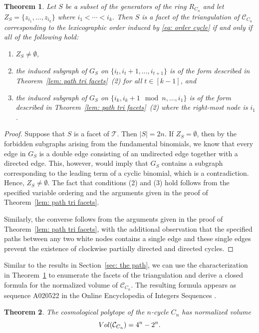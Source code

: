 \documentclass[11pt]{article}
\newtheorem{theo}{Theorem}[section]
\theoremstyle{definition}
\numberwithin{equation}{section}
\begin{document}
\begin{theo}
\label{thm: cycle facets}
Let $S$ be a subset of the generators of the ring $R_{C_{n}}$ and let $Z_S = \{z_{i_1},\ldots, z_{i_k}\}$ where $i_1<\cdots < i_k$.  
Then $S$ is a facet of the triangulation of $\mathcal{C}_{C_{n}}$ corresponding to the lexicographic order induced by \eqref{eq: order cycle} if and only if all of the following hold:
\begin{enumerate}
    \item $Z_S\neq \emptyset$,
    \item the induced subgraph of $G_S$ on $\{i_t, i_t+1,\ldots, i_{t+1}\}$ is of the form described in Theorem~\ref{lem: path tri facets}~(2) for all $t\in[k-1]$, and
    \item the induced subgraph of $G_S$ on $\{i_k, i_k+1 \mod n,\ldots, i_{1}\}$ is of the form described in Theorem~\ref{lem: path tri facets}~(2) where the right-most node is $i_1$.
\end{enumerate}
\end{theo}

\begin{proof}
Suppose that $S$ is a facet of $\mathcal{T}$.  
Then $|S| = 2n$. 
If $Z_S = \emptyset$, then by the forbidden subgraphs arising from the fundamental binomials, we know that every edge in $G_S$ is a double edge consisting of an undirected edge together with a directed edge. 
This, however, would imply that $G_S$ contains a subgraph corresponding to the leading term of a cyclic  binomial, which is a contradiction. 
Hence, $Z_S\neq \emptyset$. 
The fact that conditions (2) and (3) hold follows from the specified variable ordering and the arguments given in the proof of Theorem~\ref{lem: path tri facets}.

Similarly, the converse follows from the arguments given in the proof of Theorem~\ref{lem: path tri facets}, with the additional observation that the specified paths between any two white nodes contains a single edge and these single edges prevent the existence of clockwise partially directed and directed cycles. 
\end{proof}

Similar to the results in Section~\ref{sec: the path}, we can use the characterization in Theorem~\ref{thm: cycle facets} to enumerate the facets of the triangulation and derive a closed formula for the normalized volume of $\mathcal{C}_{C_n}$. 
The resulting formula appears as sequence A020522 in the Online Encyclopedia of Integers Sequences \cite{OEIS}. 
\begin{theo}\label{thm : vol cycle}
    The cosmological polytope of the $n$-cycle $C_n$ has normalized volume
    \[
        \textnormal{Vol}(\mathcal{C}_{C_n})=4^n-2^n.
    \]
\end{theo}
\end{document}
